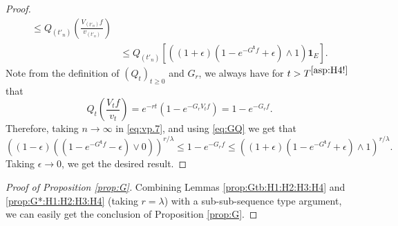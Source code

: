 \documentclass[12pt,a4paper]{amsart}
\numberwithin{equation}{section}
\theoremstyle{plain}
\theoremstyle{definition}
\theoremstyle{remark}
\begin{document}
\begin{proof}
\begin{align}
	\leq Q_{(t'_n)}\left( \frac{V_{(t'_n)}f}{v_{(t'_n)}} \right)
	\\&\leq Q_{(t'_n)}\left[ \left((1+\epsilon) ( 1 - e^{- G^{\mathbf t}f} + \epsilon) \wedge 1\right) \mathbf 1_E \right].
\end{align}
	Note from the definition of $(Q_t)_{t\geq 0}$ and $G_r$, we always have for $t>T^{\eqref{asp:H4!}}$ that
\[
	Q_t \left( \frac{V_tf}{v_t}  \right)
	= e^{- r t}( 1 - e^{- G_rV_tf}  )
	= 1- e^{- G_r f}.
\]
	Therefore, taking $n \to \infty$ in \eqref{eq:vp.7}, and using \eqref{eq:GQ}  we get that
\[
	\left((1-\epsilon) \left((1 - e^{- G^{\mathbf t}f} - \epsilon)\vee 0\right) \right)^{r/\lambda}
	\leq 1 - e^{- G_r f}
	 \leq \left((1 + \epsilon) (1 - e^{- G^{\mathbf t} f} + \epsilon)\wedge 1 \right)^{r/\lambda}.
\]
	Taking $\epsilon \to 0$, we get the desired result.
\end{proof}

\begin{proof}[Proof of Proposition \ref{prop:G}]
	Combining  Lemmas \ref{prop:Gtb:H1:H2:H3:H4} and \ref{prop:G*:H1:H2:H3:H4}
	(taking $r=\lambda$)
	with a sub-sub-sequence type argument, we can easily get the conclusion of Proposition \ref{prop:G}.
\end{proof}
\end{document}
